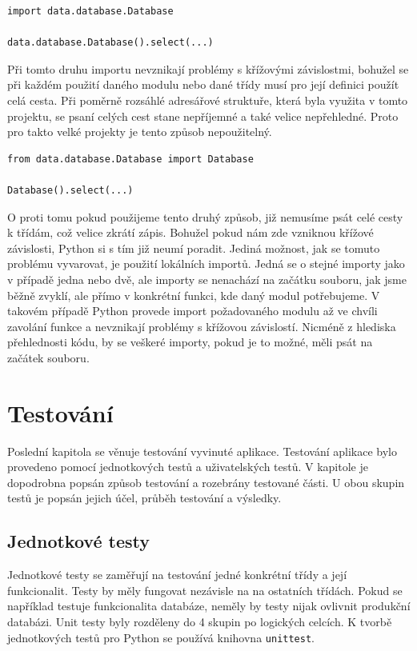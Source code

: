 \documentclass[thesis=B,czech]{resources/FITthesis}[2012/06/26]
\begin{document}
\begin{listing}[htbp]
\begin{verbatim}
import data.database.Database

data.database.Database().select(...)
\end{verbatim}
\end{listing}

Při tomto druhu importu nevznikají problémy s křížovými závislostmi, bohužel se při každém použití daného modulu nebo dané třídy musí pro její definici použít celá cesta. Při poměrně rozsáhlé adresářové struktuře, která byla využita v tomto projektu, se psaní celých cest stane nepříjemné a také velice nepřehledné. Proto pro takto velké projekty je tento způsob nepoužitelný.

\begin{listing}[htbp]
\begin{verbatim}
from data.database.Database import Database

Database().select(...)
\end{verbatim}
\end{listing}
O proti tomu pokud použijeme tento druhý způsob, již nemusíme psát celé cesty k třídám, což velice zkrátí zápis. Bohužel pokud nám zde vzniknou křížové závislosti, Python si s tím již neumí poradit. Jediná možnost, jak se tomuto problému vyvarovat, je použití lokálních importů. Jedná se o stejné importy jako v případě jedna nebo dvě, ale importy se nenachází na začátku souboru, jak jsme běžně zvyklí, ale přímo v konkrétní funkci, kde daný modul potřebujeme. V takovém případě Python provede import požadovaného modulu až ve chvíli zavolání funkce a nevznikají problémy s křížovou závislostí. Nicméně z hlediska přehlednosti kódu, by se veškeré importy, pokud je to možné, měli psát na začátek souboru. 

\chapter{Testování}
Poslední kapitola se věnuje testování vyvinuté aplikace. Testování aplikace bylo provedeno pomocí jednotkových testů a uživatelských testů. V kapitole je dopodrobna popsán způsob testování a rozebrány testované části. U obou skupin testů je popsán jejich účel, průběh testování a výsledky.
	\section{Jednotkové testy}
Jednotkové testy se zaměřují na testování jedné konkrétní třídy a její funkcionalit. Testy by měly fungovat nezávisle na na ostatních třídách. Pokud se například testuje funkcionalita databáze, neměly by testy nijak ovlivnit produkční databázi. Unit testy byly rozděleny do 4 skupin po logických celcích. K tvorbě jednotkových testů pro Python se používá knihovna \texttt{unittest}.
\end{document}
